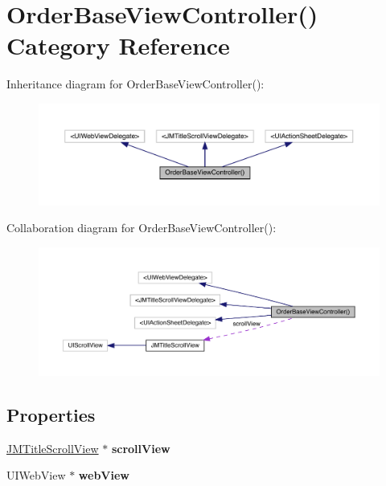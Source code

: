 \hypertarget{category_order_base_view_controller_07_08}{}\section{Order\+Base\+View\+Controller() Category Reference}
\label{category_order_base_view_controller_07_08}


Inheritance diagram for Order\+Base\+View\+Controller()\+:\nopagebreak
\begin{figure}[H]
\begin{center}
\leavevmode
\includegraphics[width=350pt]{category_order_base_view_controller_07_08__inherit__graph}
\end{center}
\end{figure}


Collaboration diagram for Order\+Base\+View\+Controller()\+:\nopagebreak
\begin{figure}[H]
\begin{center}
\leavevmode
\includegraphics[width=350pt]{category_order_base_view_controller_07_08__coll__graph}
\end{center}
\end{figure}
\subsection*{Properties}
\begin{DoxyCompactItemize}
\item 
\mbox{\label{category_order_base_view_controller_07_08_ace5d679cf3b0b79d0fbd3b184a7ff8ba}} 
\mbox{\hyperlink{interface_j_m_title_scroll_view}{J\+M\+Title\+Scroll\+View}} $\ast$ {\bfseries scroll\+View}
\item 
\mbox{\label{category_order_base_view_controller_07_08_a956010d0be1b0651e811272d02dbe687}} 
U\+I\+Web\+View $\ast$ {\bfseries web\+View}
\end{DoxyCompactItemize}


